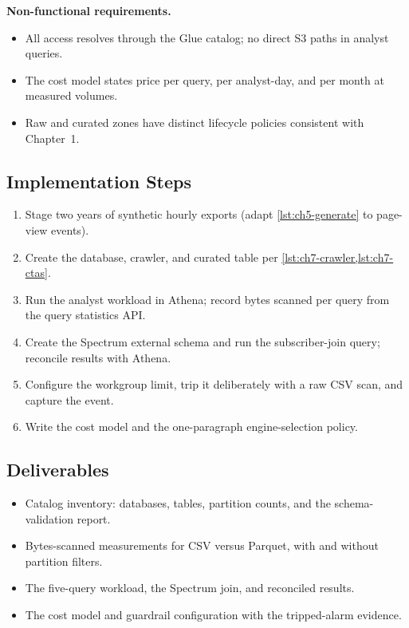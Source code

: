 \textbf{Non-functional requirements.}
\begin{itemize}
    \item All access resolves through the Glue catalog; no direct S3 paths in analyst queries.
    \item The cost model states price per query, per analyst-day, and per month at measured volumes.
    \item Raw and curated zones have distinct lifecycle policies consistent with Chapter~1.
\end{itemize}

\subsection*{Implementation Steps}
\begin{enumerate}
    \item Stage two years of synthetic hourly exports (adapt \cref{lst:ch5-generate} to page-view events).
    \item Create the database, crawler, and curated table per \cref{lst:ch7-crawler,lst:ch7-ctas}.
    \item Run the analyst workload in Athena; record bytes scanned per query from the query statistics API.
    \item Create the Spectrum external schema and run the subscriber-join query; reconcile results with Athena.
    \item Configure the workgroup limit, trip it deliberately with a raw CSV scan, and capture the event.
    \item Write the cost model and the one-paragraph engine-selection policy.
\end{enumerate}

\subsection*{Deliverables}
\begin{itemize}
    \item Catalog inventory: databases, tables, partition counts, and the schema-validation report.
    \item Bytes-scanned measurements for CSV versus Parquet, with and without partition filters.
    \item The five-query workload, the Spectrum join, and reconciled results.
    \item The cost model and guardrail configuration with the tripped-alarm evidence.
\end{itemize}

